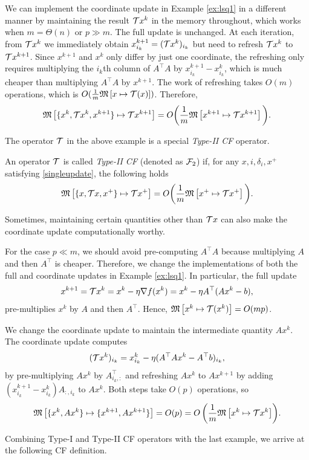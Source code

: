 \begin{example}\label{ex:lsq2}
We can implement the coordinate update in Example \ref{ex:lsq1} in a different manner by maintaining the result ${\mathcal{T}} x^k$ in the memory throughout, which works when $m=\Theta(n)$ or $p\gg m$. The full update is unchanged.
At each iteration, from ${\mathcal{T}} x^k$ we immediately obtain $x_{i_k}^{k+1}=({\mathcal{T}} x^k )_{i_k}$ but  need to refresh ${\mathcal{T}} x^k$ to ${\mathcal{T}} x^{k+1}$.
Since $x^{k+1}$ and $x^k$ only differ by just one coordinate, the refreshing only requires multiplying the $i_k$th column of $A^\top A$ by $x^{k+1}_{i_k}-x^k_{i_k}$, which is much cheaper than multiplying $A^\top A$ by $x^{k+1}$. The work of refreshing takes $O(m)$ operations, which is $O(\frac{1}{m}\mathfrak{M}\left[{x}\mapsto {{\mathcal{T}}(x)}\right])$.
Therefore,
$$\mathfrak{M}\left[{\{ x^k,{\mathcal{T}} x^k, x^{k+1}\}}\mapsto { {\mathcal{T}}x^{k+1}}\right]= O\bigg(\frac{1}{m}  \mathfrak{M}\left[{x^{k+1}}\mapsto {{\mathcal{T}}x^{k+1}}\right] \bigg).$$
\end{example}
The operator ${\mathcal{T}}$ in the above example is a special \emph{Type-II CF} operator.

\begin{definition}[Type-II CF]
An operator ${\mathcal{T}}$ is called \emph{Type-II CF} (denoted as ${\mathcal{F}}_2$) if, for any $x,i,\delta_i,x^+$ satisfying \eqref{singleupdate}, the following holds
\begin{equation}\label{op-cuf2} \nops{\{ x,\cT x, x^+\}}{ \cT x^+}= O\bigg(\frac{1}{m}\nops{x^+}{\cT x^+}\bigg).
\end{equation}
\end{definition}
Sometimes, maintaining certain quantities other than ${\mathcal{T}} x$ can also make the coordinate update computationally worthy.
\begin{example}\label{ex:lsq3}
For the case $p\ll m$, we should avoid pre-computing $A^\top A$ because multiplying $A$ and then $A^\top$ is cheaper. Therefore, we change the implementations of both the full and coordinate updates in Example \ref{ex:lsq1}. In particular, the full update
$$x^{k+1}={\mathcal{T}} x^k =x^k-\eta\nabla f(x^k)=x^k-\eta A^\top (Ax^k-b),$$
pre-multiplies $x^k$ by $A$ and then $A^\top$. Hence,
$\mathfrak{M}\left[{x^k}\mapsto {{\mathcal{T}}(x^k)}\right]=O(mp)$.

We change the coordinate update to maintain the intermediate quantity $Ax^k$. The coordinate update computes
$$({\mathcal{T}} x^k)_{i_k}=x^k_{i_k}-\eta (A^\top Ax^k-A^\top b)_{i_k},$$
by pre-multiplying $Ax^k$ by $A^{\top}_{i_k,:}$ and refreshing $Ax^k$ to $Ax^{k+1}$ by adding $(x^{k+1}_{i_k}-x^k_{i_k}) A_{:,i_k}$ to $A x^k$. Both steps take $O(p)$ operations, so
\begin{displaymath}{\nops{\{x^k,Ax^k\}}{\{x^{k+1},Ax^{k+1}\}}=O(p)=O\left(\frac{1}{m}\nops{x^k}{\cT x^k}\right)}.\end{displaymath}
\end{example}
Combining Type-I and Type-II CF operators with the last example, we arrive at the following CF definition.

